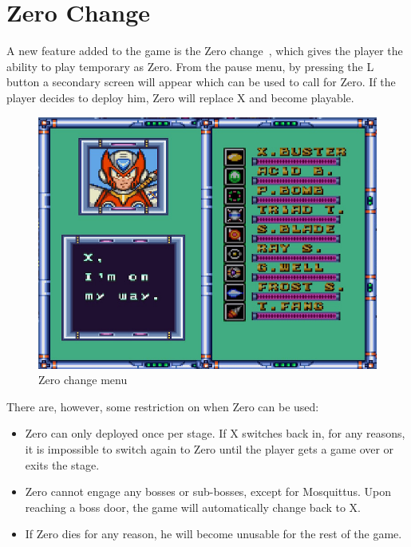 \section{Zero Change}\label{X3:Zero}
A new feature added to the game is the Zero change~\cite{wiki:Zero_change}, which gives the player the ability to play temporary as Zero. From the pause menu, by pressing the L button a secondary screen will appear which can be used to call for Zero. If the player decides to deploy him, Zero will replace X and become playable. 
\begin{figure}[htp] 
	\centering
	\includegraphics[width=.5\linewidth]{figures/X3/weapons/Zero_screen.png}
	\caption{Zero change menu}
\end{figure}
There are, however, some restriction on when Zero can be used:
\begin{itemize}
	\item Zero can only deployed once per stage. If X switches back in, for any reasons, it is impossible to switch again to Zero until the player gets a game over or exits the stage.
	\item Zero cannot engage any bosses or sub-bosses, except for Mosquittus. Upon reaching a boss door, the game will automatically change back to X.
	\item If Zero dies for any reason, he will become unusable for the rest of the game.
\end{itemize}
